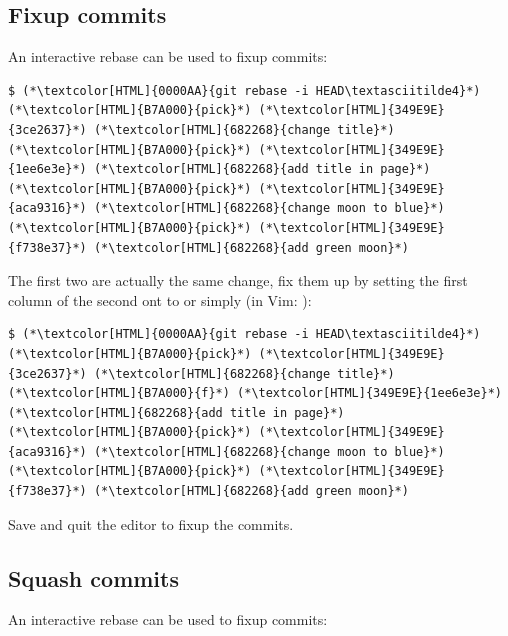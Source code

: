 \subsection{Fixup commits}
\begin{frame}[fragile]
  \subslidetitle
  An interactive rebase can be used to fixup commits:

  \begin{lstlisting}
$ (*\textcolor[HTML]{0000AA}{git rebase -i HEAD\textasciitilde4}*)
(*\textcolor[HTML]{B7A000}{pick}*) (*\textcolor[HTML]{349E9E}{3ce2637}*) (*\textcolor[HTML]{682268}{change title}*)
(*\textcolor[HTML]{B7A000}{pick}*) (*\textcolor[HTML]{349E9E}{1ee6e3e}*) (*\textcolor[HTML]{682268}{add title in page}*)
(*\textcolor[HTML]{B7A000}{pick}*) (*\textcolor[HTML]{349E9E}{aca9316}*) (*\textcolor[HTML]{682268}{change moon to blue}*)
(*\textcolor[HTML]{B7A000}{pick}*) (*\textcolor[HTML]{349E9E}{f738e37}*) (*\textcolor[HTML]{682268}{add green moon}*)
\end{lstlisting}

  The first two are actually the same change, fix them up by setting the first
  column of the second ont to  or simply  (in Vim: ):

  \begin{lstlisting}
$ (*\textcolor[HTML]{0000AA}{git rebase -i HEAD\textasciitilde4}*)
(*\textcolor[HTML]{B7A000}{pick}*) (*\textcolor[HTML]{349E9E}{3ce2637}*) (*\textcolor[HTML]{682268}{change title}*)
(*\textcolor[HTML]{B7A000}{f}*) (*\textcolor[HTML]{349E9E}{1ee6e3e}*) (*\textcolor[HTML]{682268}{add title in page}*)
(*\textcolor[HTML]{B7A000}{pick}*) (*\textcolor[HTML]{349E9E}{aca9316}*) (*\textcolor[HTML]{682268}{change moon to blue}*)
(*\textcolor[HTML]{B7A000}{pick}*) (*\textcolor[HTML]{349E9E}{f738e37}*) (*\textcolor[HTML]{682268}{add green moon}*)
\end{lstlisting}

  Save and quit the editor to fixup the commits.
\end{frame}

\subsection{Squash commits}
\begin{frame}[fragile]
  \subslidetitle
  An interactive rebase can be used to fixup commits:

\end{frame}

